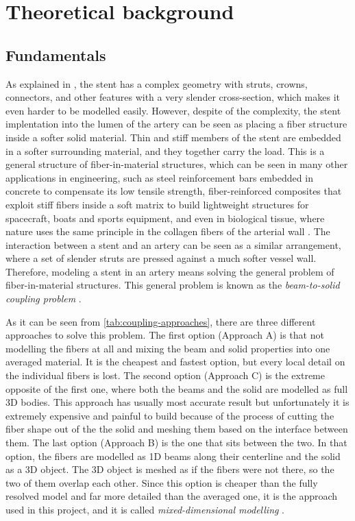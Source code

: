\section{Theoretical background}
\label{sec:background}


\subsection{Fundamentals}
\label{sec:fundamentals}

As explained in , the stent has a complex geometry with struts, crowns, connectors, and other features with a very slender cross-section, which makes it even harder to be modelled easily. However, despite of the complexity, the stent implentation into the lumen of the artery can be seen as placing a fiber structure inside a softer solid material. Thin and stiff members of the stent are embedded in a softer surrounding material, and they together carry the load. This is a general structure of fiber-in-material structures, which can be seen in many other applications in engineering, such as steel reinforcement bars embedded in concrete to compensate its low tensile strength, fiber-reinforced composites that exploit stiff fibers inside a soft matrix to build lightweight structures for spacecraft, boats and sports equipment, and even in biological tissue, where nature uses the same principle in the collagen fibers of the arterial wall \citep{steinbrecher2020}. The interaction between a stent and an artery can be seen as a similar arrangement, where a set of slender struts are pressed against a much softer vessel wall. Therefore, modeling a stent in an artery means solving the general problem of fiber-in-material structures. This general problem is known as the \emph{beam-to-solid coupling problem} \citep{steinbrecher2020}.

As it can be seen from \cref{tab:coupling-approaches}, there are three different approaches to solve this problem. The first option (Approach A) is that not modelling the fibers at all and mixing the beam and solid properties into one averaged material. It is the cheapest and fastest option, but every local detail on the individual fibers is lost. The second option (Approach C) is the extreme opposite of the first one, where both the beams and the solid are modelled as full 3D bodies. This approach has usually most accurate result but unfortunately it is extremely expensive and painful to build because of the process of cutting the fiber shape out of the the solid and meshing them based on the interface between them. The last option (Approach B) is the one that sits between the two. In that option, the fibers are modelled as 1D beams along their centerline and the solid as a 3D object. The 3D object is meshed as if the fibers were not there, so the two of them overlap each other. Since this option is cheaper than the fully resolved model and far more detailed than the averaged one, it is the approach used in this project, and it is called \emph{mixed-dimensional modelling} \citep{steinbrecher2020}.

